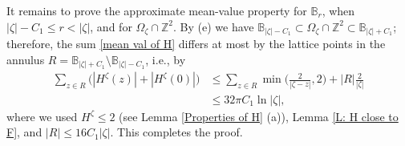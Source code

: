 \documentclass[11pt]{article}
\makeatletter
\renewenvironment{proof}[1][\proofname]{
   \par\pushQED{\qed}\normalfont
   \topsep6\p@\@plus6\p@\relax
   \trivlist\item[\hskip\labelsep\bfseries#1\@addpunct{.}]
   \ignorespaces
}{
   \popQED\endtrivlist\@endpefalse
}
\numberwithin{equation}{section}
\def\OZ{\Omega_{\zeta}}
\makeatother
\begin{document}
\begin{proof}[Proof of Lemma \ref{Properties of H}]
\begin{itemize}
      It remains to prove the approximate 
      mean-value property for $\mathbb{B}_r$, 
      when $|\zeta| - C_1 \leq r < |\zeta|$, 
      and for $\Omega_{\zeta} \cap \mathbb{Z}^2$. 
      By (e) we have
      $\mathbb{B}_{|\zeta|-C_1} \subset \OZ \cap \mathbb{Z}^2 
      \subset \mathbb{B}_{|\zeta|+C_1}$; 
      therefore, the sum \eqref{mean val of H}
      differs at most by the lattice points in the annulus 
      $R=\mathbb{B}_{|\zeta| +C_1} \setminus \mathbb{B}_{|\zeta| - C_1}$, i.e., by 
      \begin{equation}\nonumber 
        \begin{split}
          \sum_{z \in R} \big( |H^{\zeta}(z)| + |H^{\zeta}(0)| \big) 
          &\leq  \sum_{z \in R} 
              \min \bigg( \frac{2}{|\zeta - z|}, 2 \bigg)
              + |R| \frac{2}{|\zeta|}\\
          &\leq 32 \pi C_1 \ln |\zeta|,
        \end{split}
      \end{equation} 
      where we used $H^{\zeta} \leq 2$ (see Lemma \ref{Properties of H} (a)), 
      Lemma \ref{L: H close to F}, and $|R| \leq 16 C_1 |\zeta|$. 
      This completes the proof. 
  \end{itemize}
\end{proof}
\end{document}
